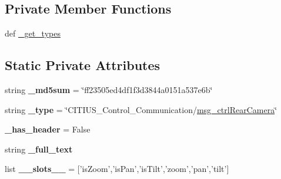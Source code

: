 \subsection*{\-Private \-Member \-Functions}
\begin{DoxyCompactItemize}
\item 
def \hyperlink{class_c_i_t_i_u_s___control___communication_1_1msg_1_1__msg__ctrl_rear_camera_1_1msg__ctrl_rear_camera_ae0c8fd95c51138dd47d0fbf60789bdbc}{\-\_\-get\-\_\-types}
\end{DoxyCompactItemize}
\subsection*{\-Static \-Private \-Attributes}
\begin{DoxyCompactItemize}
\item 
\hypertarget{class_c_i_t_i_u_s___control___communication_1_1msg_1_1__msg__ctrl_rear_camera_1_1msg__ctrl_rear_camera_a30edcfe7ce44aa9c53db856fbf6f17d3}{string {\bfseries \-\_\-md5sum} = \char`\"{}ff23505ed4df1f3d3844a0151a537e6b\char`\"{}}\label{class_c_i_t_i_u_s___control___communication_1_1msg_1_1__msg__ctrl_rear_camera_1_1msg__ctrl_rear_camera_a30edcfe7ce44aa9c53db856fbf6f17d3}

\item 
\hypertarget{class_c_i_t_i_u_s___control___communication_1_1msg_1_1__msg__ctrl_rear_camera_1_1msg__ctrl_rear_camera_a8f86563e608aee1afae83c7a7aefa4dc}{string {\bfseries \-\_\-type} = \char`\"{}\-C\-I\-T\-I\-U\-S\-\_\-\-Control\-\_\-\-Communication/\hyperlink{class_c_i_t_i_u_s___control___communication_1_1msg_1_1__msg__ctrl_rear_camera_1_1msg__ctrl_rear_camera}{msg\-\_\-ctrl\-Rear\-Camera}\char`\"{}}\label{class_c_i_t_i_u_s___control___communication_1_1msg_1_1__msg__ctrl_rear_camera_1_1msg__ctrl_rear_camera_a8f86563e608aee1afae83c7a7aefa4dc}

\item 
\hypertarget{class_c_i_t_i_u_s___control___communication_1_1msg_1_1__msg__ctrl_rear_camera_1_1msg__ctrl_rear_camera_a492c375e24f7dd9278fc0f0b93ea772a}{{\bfseries \-\_\-has\-\_\-header} = \-False}\label{class_c_i_t_i_u_s___control___communication_1_1msg_1_1__msg__ctrl_rear_camera_1_1msg__ctrl_rear_camera_a492c375e24f7dd9278fc0f0b93ea772a}

\item 
string {\bfseries \-\_\-full\-\_\-text}
\item 
\hypertarget{class_c_i_t_i_u_s___control___communication_1_1msg_1_1__msg__ctrl_rear_camera_1_1msg__ctrl_rear_camera_a65e953a869a612cf4aa2f27c90c142de}{list {\bfseries \-\_\-\-\_\-slots\-\_\-\-\_\-} = \mbox{[}'is\-Zoom','is\-Pan','is\-Tilt','zoom','pan','tilt'\mbox{]}}\label{class_c_i_t_i_u_s___control___communication_1_1msg_1_1__msg__ctrl_rear_camera_1_1msg__ctrl_rear_camera_a65e953a869a612cf4aa2f27c90c142de}


\end{DoxyCompactItemize}
